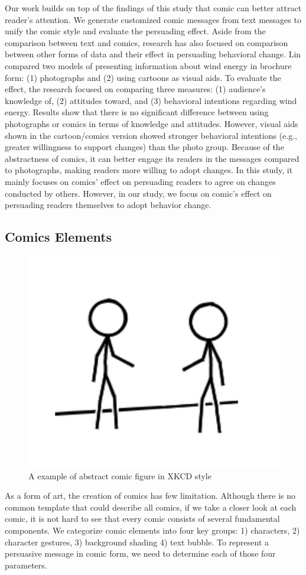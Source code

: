 Our work builds on top of the findings of this study that comic can better attract reader's attention. We generate customized comic messages from text messages to unify the comic style and evaluate the persuading effect. Aside from the comparison between text and comics, research has also focused on comparison between other forms of data and their effect in persuading behavioral change. Lin compared two models of presenting information about wind energy in brochure form: (1) photographs and (2) using cartoons as visual aids. To evaluate the effect, the research focused on comparing three measures: (1) audience's knowledge of, (2) attitudes toward, and (3) behavioral intentions regarding wind energy. Results show that there is no significant difference between using photographs or comics in terms of knowledge and attitudes. However, visual aids shown in the cartoon/comics version showed stronger behavioral intentions (e.g., greater willingness to support changes) than the photo group. Because of the abstractness of comics, it can better engage its readers in the messages compared to photographs, making readers more willing to adopt changes. In this study, it mainly focuses on comics' effect on persuading readers to agree on changes conducted by others. However, in our study, we focus on comic's effect on persuading readers themselves to adopt behavior change.\par



\subsection{Comics Elements}
\begin{figure}
  \centering
  \includegraphics[width=0.3\columnwidth]{figures/xkcd_example}
  \caption{A example of abstract comic figure in XKCD style}
  \label{fig:xkcd}
\end{figure}

As a form of art, the creation of comics has few limitation. Although there is no common template that could describe all comics, if we take a closer look at each comic, it is not hard to see that every comic consists of several fundamental components. We categorize comic elements into four key groups: 1) characters, 2) character gestures, 3) background shading 4) text bubble. To represent a persuasive message in comic form, we need to determine each of those four parameters.

